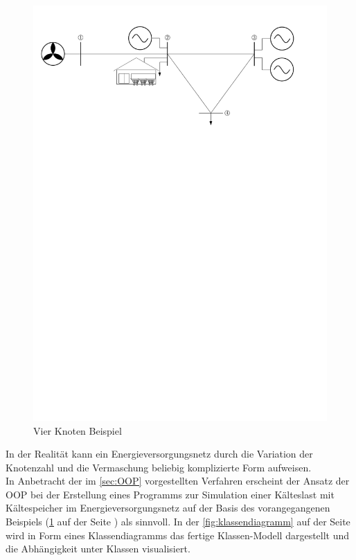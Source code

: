 \begin{figure}[h]
	\begin{center}
	\includegraphics[scale=0.75]{images/SEVN/power_grid}
	\end{center}
\caption{Vier Knoten Beispiel}
\label{fig:vkb}
\end{figure}

\noindent In der Realität kann ein Energieversorgungsnetz durch die Variation
der Knotenzahl und die Vermaschung beliebig komplizierte Form aufweisen. \\

In Anbetracht der im \cref{sec:OOP} vorgestellten Verfahren erscheint der Ansatz
der OOP bei der Erstellung eines Programms zur Simulation einer K\"alteslast mit
K\"altespeicher im Energieversorgungsnetz auf der Basis des vorangegangenen
Beispiels (\cref{fig:vkb} auf der Seite \pageref{fig:vkb}) als sinnvoll. In der
\cref{fig:klassendiagramm} auf der Seite \pageref{fig:klassendiagramm} wird in
Form eines Klassendiagramms das fertige Klassen-Modell dargestellt und die
Abh\"angigkeit unter Klassen visualisiert.


